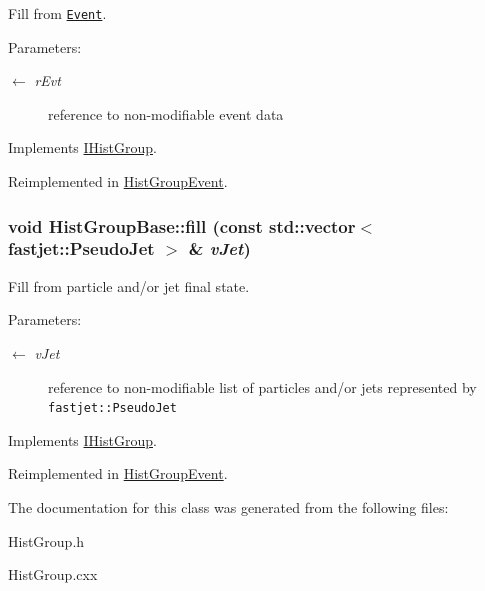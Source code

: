 Fill from {\tt \hyperlink{classEvent}{Event}}. 

\begin{Desc}
\item[Parameters:]
\begin{description}
\item[\mbox{$\leftarrow$} {\em r\-Evt}]reference to non-modifiable event data \end{description}
\end{Desc}


Implements \hyperlink{classIHistGroup_5ccd836df9105ea290ef680b977a0e0c}{IHist\-Group}.

Reimplemented in \hyperlink{classHistGroupEvent_78f86b37c41ad91e5d14cfd082e64658}{Hist\-Group\-Event}.\hypertarget{classHistGroupBase_ea81dcbe971622e6c6f4f8c5bea582d2}{
\subsubsection[fill]{\setlength{\rightskip}{0pt plus 5cm}void Hist\-Group\-Base::fill (const std::vector$<$ fastjet::Pseudo\-Jet $>$ \& {\em v\-Jet})}}
\label{classHistGroupBase_ea81dcbe971622e6c6f4f8c5bea582d2}


Fill from particle and/or jet final state. 

\begin{Desc}
\item[Parameters:]
\begin{description}
\item[\mbox{$\leftarrow$} {\em v\-Jet}]reference to non-modifiable list of particles and/or jets represented by {\tt fastjet::Pseudo\-Jet} \end{description}
\end{Desc}


Implements \hyperlink{classIHistGroup_72fe456887f185ecbd538bdda92a9f5a}{IHist\-Group}.

Reimplemented in \hyperlink{classHistGroupEvent_7cdf3dd95af609b72fa981a389a21070}{Hist\-Group\-Event}.

The documentation for this class was generated from the following files:\begin{CompactItemize}
\item 
Hist\-Group.h\item 
Hist\-Group.cxx\end{CompactItemize}
